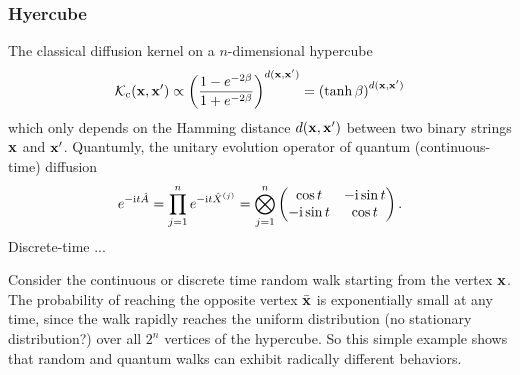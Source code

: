 \subsubsection{Hyercube}
The classical diffusion kernel on a $n$-dimensional hypercube 
\begin{equation}
	\mathcal{K}_{\textup{c}}(\vb{x},\vb{x}')  
	\propto
	\qty(
		\frac{1-e^{-2\beta}}{1+e^{-2\beta}}
	)^{d(\vb{x},\vb{x}')}
	= \qty(\tanh \beta)^{d(\vb{x},\vb{x}')}
\end{equation}
which only depends on the Hamming distance $d(\vb{x},\vb{x}')$ between two binary strings $\vb{x}$ and $\vb{x}'$.
Quantumly, the unitary evolution operator of quantum (continuous-time) diffusion 
\begin{equation}
	e^{-\textup{i} t \hat{A}} = 
	\prod_{j=1}^n e^{-\textup{i} t \hat{X}^{(j)} }
	= \bigotimes_{j=1}^n
	\begin{pmatrix}
		\cos t & -\textup{i} \sin t \\ 
		-\textup{i} \sin t & \cos t
	\end{pmatrix}.
\end{equation}
Discrete-time ...
\cite{mooreQuantumWalksHypercube2001}
\begin{remark}
	Consider the continuous or discrete time random walk starting from the vertex $\vb{x}$. 
	The probability of reaching the opposite vertex $\bar{\vb{x}}$ is exponentially small at any time, since the walk rapidly reaches the uniform distribution (no stationary distribution?) over all $2^n$ vertices of the hypercube. 
	So this simple example shows that random and quantum walks can exhibit radically different behaviors.
\end{remark}


